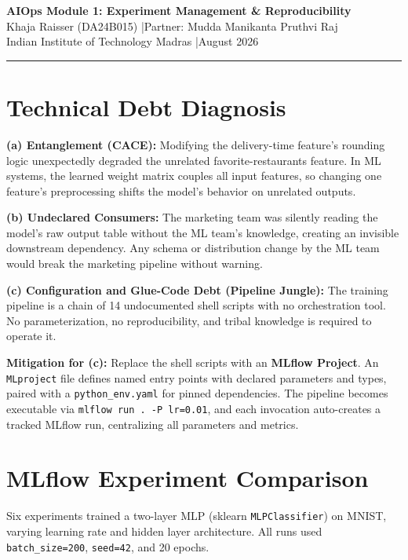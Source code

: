 \documentclass[10pt, a4paper]{article}
\begin{document}
\begin{center}
    {\Large \textbf{AIOps Module 1: Experiment Management \& Reproducibility}}\\[4pt]
    {\normalsize Khaja Raisser (DA24B015) \quad|\quad Partner: Mudda Manikanta Pruthvi Raj}\\[2pt]
    {\small Indian Institute of Technology Madras \quad|\quad August 2026}
\end{center}

\vspace{-2pt}
\hrule
\vspace{4pt}

\section{Technical Debt Diagnosis}

\textbf{(a) Entanglement (CACE):} Modifying the delivery-time feature's rounding logic unexpectedly degraded the unrelated favorite-restaurants feature. In ML systems, the learned weight matrix couples all input features, so changing one feature's preprocessing shifts the model's behavior on unrelated outputs.

\textbf{(b) Undeclared Consumers:} The marketing team was silently reading the model's raw output table without the ML team's knowledge, creating an invisible downstream dependency. Any schema or distribution change by the ML team would break the marketing pipeline without warning.

\textbf{(c) Configuration and Glue-Code Debt (Pipeline Jungle):} The training pipeline is a chain of 14 undocumented shell scripts with no orchestration tool. No parameterization, no reproducibility, and tribal knowledge is required to operate it.

\textbf{Mitigation for (c):} Replace the shell scripts with an \textbf{MLflow Project}. An \texttt{MLproject} file defines named entry points with declared parameters and types, paired with a \texttt{python\_env.yaml} for pinned dependencies. The pipeline becomes executable via \texttt{mlflow run .\ -P lr=0.01}, and each invocation auto-creates a tracked MLflow run, centralizing all parameters and metrics.

\section{MLflow Experiment Comparison}

Six experiments trained a two-layer MLP (sklearn \texttt{MLPClassifier}) on MNIST, varying learning rate and hidden layer architecture. All runs used \texttt{batch\_size=200}, \texttt{seed=42}, and 20 epochs.
\end{document}
